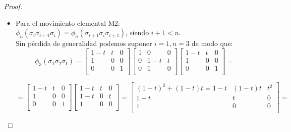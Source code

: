 \documentclass[14pt]{extarticle}
\begin{document}
\begin{proof}
\begin{itemize}
	 	 \item Para el movimiento elemental M2: \\
	  	 $ \phi_{n}(\sigma_{i}\sigma_{i+1}\sigma_{i}) = \phi_{n}(\sigma_{i+1}\sigma_{i}\sigma_{i+1})$, siendo $ i+1<n $.\\
	  	 Sin pérdida de generalidad podemos suponer $i=1, n=3$ de modo que:
	  	 	\[ \phi_{3}(\sigma_{1}\sigma_{2}\sigma_{1}) = 
	  	 	\begin{bmatrix}
	  	 	  1-t & t & 0  \\
	  	 	  1 & 0 & 0 \\
	  	 	  0 & 0 & 1 \\
	  	 	\end{bmatrix}\begin{bmatrix}
	  	 	1 & 0 & 0 \\
	  	 	0 & 1-t & t \\
	  	 	0 & 1 & 0 \\
	  	 	\end{bmatrix}\begin{bmatrix}
	  	 	1-t & t & 0  \\
	  	 	1 & 0 & 0 \\
	  	 	0 & 0 & 1 \\
	  	 	\end{bmatrix}=\]
	  	 	
	  	 	\[ = 
	  	 	\begin{bmatrix}
	  	 	1-t & t & 0  \\
	  	 	1 & 0 & 0 \\
	  	 	0 & 0 & 1 \\
	  	 	\end{bmatrix}\begin{bmatrix}
	  	 	1-t & t & 0  \\
	  	 	1-t & 0 & t \\
	  	 	1 & 0 & 0 \\
	  	 	\end{bmatrix}=
	  	 	\begin{bmatrix}
	  	 	(1-t)^{2}+(1-t)t = 1-t & (1-t)t & t^{2}  \\
	  	 	1-t & t & 0 \\
	  	 	1 & 0 & 0 \\
	  	 	\end{bmatrix}=\]
	  	 	

\end{itemize}
\end{proof}
\end{document}
